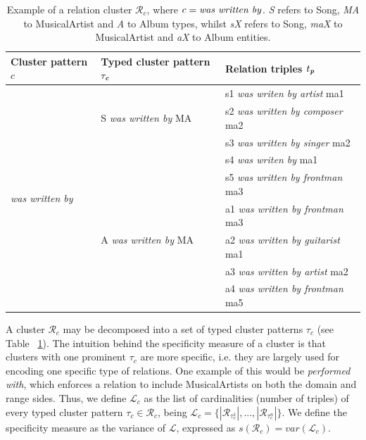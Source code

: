 \begin{table}[]
\scriptsize
	\begin{tabular}{ | l | l | l | }
	\hline
\textbf{Cluster pattern $c$} & \textbf{Typed cluster pattern $ \tau_\textbf{\textit{c}}$} & \textbf{Relation triples $t_\textbf{\textit{p}}$} \\
\hline
\multirow{10}{*}{\textit{was written by}} & \multirow{3}{*}{S \textit{was written by} MA} & s1 \textit{was writen by artist} ma1 \\
\cline{3-3}
 &  & s2 \textit{was written by composer} ma2 \\
\cline{3-3}
 &  & s3 \textit{was written by singer} ma2 \\
\cline{3-3}
&  & s4 \textit{was writen by} ma1 \\
 \cline{3-3}
&  & s5 \textit{was written by frontman} ma3 \\
\cline{2-3}
& \multirow{3}{*}{A \textit{was written by} MA} & a1 \textit{was written by frontman} ma3 \\
 \cline{3-3}
&  & a2 \textit{was written by guitarist} ma1 \\
\cline{3-3}
&  & a3 \textit{was written by artist} ma2 \\
\cline{3-3}
&  & a4 \textit{was written by frontman} ma5 \\
    \hline
	\end{tabular}
	\caption[Example of a relation cluster.]{Example of a relation cluster $\mathcal{R}_c$, where $c = \mbox{\textit{was written by}}$. \textit{S} refers to Song, \textit{MA} to MusicalArtist and \textit{A} to Album types, whilst \textit{sX} refers to Song, \textit{maX} to MusicalArtist and \textit{aX} to Album entities.}
	\label{tbl:kb:example_grouping}
\end{table}

A cluster $\mathcal{R}_c$ may be decomposed into a set of typed cluster patterns $\tau_c$ (see Table ~\ref{tbl:kb:example_grouping}). The intuition behind the specificity measure of a cluster is that clusters with one prominent $\tau_c$ are more specific, i.e. they are largely used for encoding one specific type of relations. One example of this would be \textit{performed with}, which enforces a relation to include MusicalArtists on both the domain and range sides. Thus, we define $\mathcal{L}_c$ as the list of cardinalities (number of triples) of every typed cluster pattern $\tau_c \in \mathcal{R}_c$, being $\mathcal{L}_c = \{|\mathcal{R}_{\tau_c^1}|,...,|\mathcal{R}_{\tau_c^n}|\}$. We define the specificity measure as the variance of $\mathcal{L}$, expressed as $s(\mathcal{R}_c) = var(\mathcal{L}_c)$.

